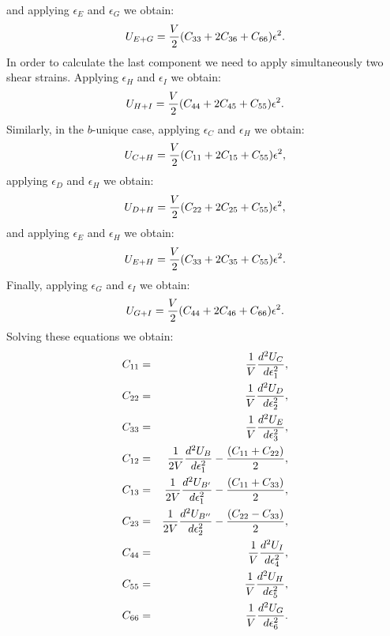\documentclass[12pt,a4paper,twoside]{report}
\begin{document}
and applying $\epsilon_E$ and $\epsilon_G$ we obtain:
\begin{equation}
U_{E+G}= {V \over 2} (C_{33}+2 C_{36} + C_{66}) \epsilon^2.
\end{equation}
In order to calculate the last component we need to apply
simultaneously two shear strains. 
Applying $\epsilon_H$ and $\epsilon_I$ we obtain:
\begin{equation}
U_{H+I}= {V \over 2} (C_{44}+2 C_{45} + C_{55}) \epsilon^2.
\end{equation}
Similarly, in the $b$-unique case, applying $\epsilon_C$ and 
$\epsilon_H$ we obtain:
\begin{equation}
U_{C+H}= {V \over 2} (C_{11}+2 C_{15} + C_{55}) \epsilon^2,
\end{equation}
applying $\epsilon_D$ and $\epsilon_H$ we obtain:
\begin{equation}
U_{D+H}= {V \over 2} (C_{22}+2 C_{25} + C_{55}) \epsilon^2,
\end{equation}
and applying $\epsilon_E$ and $\epsilon_H$ we obtain:
\begin{equation}
U_{E+H}= {V \over 2} (C_{33}+2 C_{35} + C_{55}) \epsilon^2.
\end{equation}
Finally, applying $\epsilon_G$ and $\epsilon_I$ we obtain:
\begin{equation}
U_{G+I}= {V \over 2} (C_{44}+2 C_{46} + C_{66}) \epsilon^2.
\end{equation}
Solving these equations we obtain:
\begin{eqnarray}
C_{11}&=&{1 \over V} {d^2 U_C \over d \epsilon_1^2}, \\ 
C_{22}&=&{1 \over V} {d^2 U_D \over d \epsilon_2^2}, \\ 
C_{33}&=&{1 \over V} {d^2 U_E \over d \epsilon_3^2}, \\ 
C_{12}&=&{1 \over 2 V} {d^2 U_B \over d \epsilon_1^2} - 
                             {(C_{11}+ C_{22})\over 2}, \\
C_{13}&=&{1 \over 2 V} {d^2 U_{B'} \over d \epsilon_1^2} - 
                             {(C_{11} + C_{33})\over 2}, \\
C_{23}&=&{1 \over 2 V} {d^2 U_{B''} \over d \epsilon_2^2} - 
                             {(C_{22} - C_{33})\over 2}, \\
C_{44}&=&{1 \over V} {d^2 U_I \over d \epsilon_4^2}, \\
C_{55}&=&{1 \over V} {d^2 U_H \over d \epsilon_5^2}, \\
C_{66}&=&{1 \over V} {d^2 U_G \over d \epsilon_6^2}.
\end{eqnarray}
\end{document}
